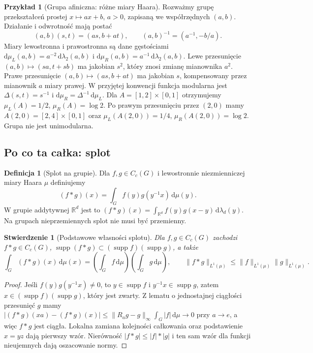 \documentclass[11pt,a4paper]{article}
\numberwithin{equation}{section}
\theoremstyle{plain}
\newtheorem{stwierdzenie}[twierdzenie]{Stwierdzenie}
\theoremstyle{definition}
\newtheorem{definicja}[twierdzenie]{Definicja}
\newtheorem{przyklad}[twierdzenie]{Przykład}
\theoremstyle{remark}
\newcommand{\R}{\mathbb R}
\newcommand{\supp}{\operatorname{supp}}
\begin{document}
\begin{przyklad}[Grupa afiniczna: różne miary Haara]
Rozważmy grupę przekształceń prostej $x\mapsto ax+b$, $a>0$, zapisaną we współrzędnych $(a,b)$. Działanie i odwrotność mają postać
\[
(a,b)(s,t)=(as,b+at),\qquad (a,b)^{-1}=(a^{-1},-b/a).
\]
Miary lewostronna i prawostronna są dane gęstościami
$\mathrm d\mu_L(a,b)=a^{-2}\,\mathrm d\lambda_2(a,b)$ i $\mathrm d\mu_R(a,b)=a^{-1}\,\mathrm d\lambda_2(a,b)$.
Lewe przesunięcie $(a,b)\mapsto(sa,t+sb)$ ma jakobian $s^2$, który znosi zmianę mianownika $a^2$. Prawe przesunięcie $(a,b)\mapsto(as,b+at)$ ma jakobian $s$, kompensowany przez mianownik $a$ miary prawej. W przyjętej konwencji funkcja modularna jest $\Delta(s,t)=s^{-1}$ i $\mathrm d\mu_R=\Delta^{-1}\,\mathrm d\mu_L$. Dla $A=[1,2]\times[0,1]$ otrzymujemy $\mu_L(A)=1/2$, $\mu_R(A)=\log2$. Po prawym przesunięciu przez $(2,0)$ mamy $A(2,0)=[2,4]\times[0,1]$ oraz $\mu_L(A(2,0))=1/4$, $\mu_R(A(2,0))=\log2$. Grupa nie jest unimodularna.
\end{przyklad}

\subsection*{Po co ta całka: splot}
\begin{definicja}[Splot na grupie]
Dla $f,g\in C_c(G)$ i lewostronnie niezmienniczej miary Haara $\mu$ definiujemy
\[
(f*g)(x)=\int_G f(y)g(y^{-1}x)\,\mathrm d\mu(y).
\]
W grupie addytywnej $\R^d$ jest to $(f*g)(x)=\int_{\R^d}f(y)g(x-y)\,\mathrm d\lambda_d(y)$. Na grupach nieprzemiennych splot nie musi być przemienny.
\end{definicja}
\begin{stwierdzenie}[Podstawowe własności splotu]
Dla $f,g\in C_c(G)$ zachodzi $f*g\in C_c(G)$, $\supp(f*g)\subset(\supp f)(\supp g)$, a także
\[
\int_G(f*g)(x)\,\mathrm d\mu(x)=\left(\int_G f\,\mathrm d\mu\right)\left(\int_G g\,\mathrm d\mu\right),\qquad
\|f*g\|_{L^1(\mu)}\le\|f\|_{L^1(\mu)}\|g\|_{L^1(\mu)}.
\]
\end{stwierdzenie}
\begin{proof}
Jeśli $f(y)g(y^{-1}x)\ne0$, to $y\in\supp f$ i $y^{-1}x\in\supp g$, zatem $x\in(\supp f)(\supp g)$, który jest zwarty. Z lematu o jednostajnej ciągłości przesunięć $g$ mamy
$|(f*g)(xa)-(f*g)(x)|\le\|R_ag-g\|_\infty\int_G|f|\,\mathrm d\mu\to0$ przy $a\to e$, a więc $f*g$ jest ciągła. Lokalna zamiana kolejności całkowania oraz podstawienie $x=yz$ dają pierwszy wzór. Nierówność $|f*g|\le|f|*|g|$ i ten sam wzór dla funkcji nieujemnych dają oszacowanie normy.
\end{proof}
\end{document}
